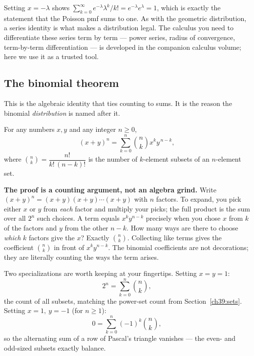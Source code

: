 \begin{connectionbox}
Setting $x = -\lambda$ shows $\sum_{k=0}^\infty e^{-\lambda}\lambda^k/k! =
e^{-\lambda}e^{\lambda} = 1$, which is exactly the statement that the Poisson
pmf sums to one. As with the geometric distribution, a series identity is what
makes a distribution legal. The calculus you need to differentiate these
series term by term --- power series, radius of convergence, term-by-term
differentiation --- is developed in the companion calculus volume; here we use
it as a trusted tool.
\end{connectionbox}

\subsection{The binomial theorem}

This is the algebraic identity that ties counting to sums. It is the reason
the binomial \emph{distribution} is named after it.

\begin{theorem}
\label{ch39:binom}
For any numbers $x, y$ and any integer $n \ge 0$,
\[
  (x + y)^{n} = \sum_{k=0}^{n} \binom{n}{k} x^{k} y^{\,n-k},
\]
where $\binom{n}{k} = \dfrac{n!}{k!\,(n-k)!}$ is the number of $k$-element
subsets of an $n$-element set.
\end{theorem}

\begin{whybox}
\textbf{The proof is a counting argument, not an algebra grind.} Write
$(x+y)^n = (x+y)(x+y)\cdots(x+y)$ with $n$ factors. To expand, you pick either
$x$ or $y$ from \emph{each} factor and multiply your picks; the full product
is the sum over all $2^n$ such choices. A term equals $x^k y^{n-k}$ precisely
when you chose $x$ from $k$ of the factors and $y$ from the other $n-k$. How
many ways are there to choose \emph{which} $k$ factors give the $x$? Exactly
$\binom{n}{k}$. Collecting like terms gives the coefficient $\binom{n}{k}$ in
front of $x^k y^{n-k}$. The binomial coefficients are not decorations; they
are literally counting the ways the term arises.
\end{whybox}

Two specializations are worth keeping at your fingertips. Setting $x = y = 1$:
\[
  2^{n} = \sum_{k=0}^{n}\binom{n}{k},
\]
the count of all subsets, matching the power-set count from
Section~\ref{ch39:sets}. Setting $x = 1,\ y = -1$ (for $n \ge 1$):
\[
  0 = \sum_{k=0}^{n}(-1)^{k}\binom{n}{k},
\]
so the alternating sum of a row of Pascal's triangle vanishes --- the even-
and odd-sized subsets exactly balance.

